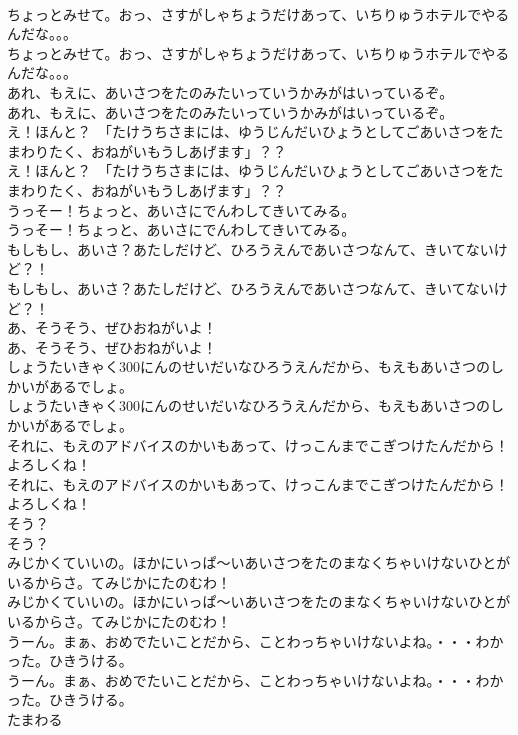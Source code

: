\documentclass[8pt]{extreport}
\begin{document}
\begin{CJK}{UTF8}{min}
\\	ちょっとみせて。おっ、さすがしゃちょうだけあって、いちりゅうホテルでやるんだな。。。
\\	ちょっとみせて。おっ、さすがしゃちょうだけあって、いちりゅうホテルでやるんだな。。。
\\	あれ、もえに、あいさつをたのみたいっていうかみがはいっているぞ。
\\	あれ、もえに、あいさつをたのみたいっていうかみがはいっているぞ。
\\	え！ほんと？　「たけうちさまには、ゆうじんだいひょうとしてごあいさつをたまわりたく、おねがいもうしあげます」？？
\\	え！ほんと？　「たけうちさまには、ゆうじんだいひょうとしてごあいさつをたまわりたく、おねがいもうしあげます」？？
\\	うっそー！ちょっと、あいさにでんわしてきいてみる。
\\	うっそー！ちょっと、あいさにでんわしてきいてみる。
\\	もしもし、あいさ？あたしだけど、ひろうえんであいさつなんて、きいてないけど？！
\\	もしもし、あいさ？あたしだけど、ひろうえんであいさつなんて、きいてないけど？！
\\	あ、そうそう、ぜひおねがいよ！
\\	あ、そうそう、ぜひおねがいよ！
\\	しょうたいきゃく300にんのせいだいなひろうえんだから、もえもあいさつのしかいがあるでしょ。
\\	しょうたいきゃく300にんのせいだいなひろうえんだから、もえもあいさつのしかいがあるでしょ。
\\	それに、もえのアドバイスのかいもあって、けっこんまでこぎつけたんだから！よろしくね！
\\	それに、もえのアドバイスのかいもあって、けっこんまでこぎつけたんだから！よろしくね！
\\	そう？
\\	そう？
\\	みじかくていいの。ほかにいっぱ～いあいさつをたのまなくちゃいけないひとがいるからさ。てみじかにたのむわ！
\\	みじかくていいの。ほかにいっぱ～いあいさつをたのまなくちゃいけないひとがいるからさ。てみじかにたのむわ！
\\	うーん。まぁ、おめでたいことだから、ことわっちゃいけないよね。・・・わかった。ひきうける。
\\	うーん。まぁ、おめでたいことだから、ことわっちゃいけないよね。・・・わかった。ひきうける。
\\	たまわる

\end{CJK}
\end{document}
